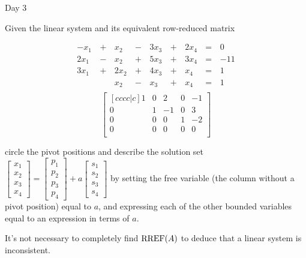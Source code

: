 \begin{applicationActivities}{Day 3}
\begin{activity}{10}
  Given the linear system and its equivalent row-reduced matrix
  \begin{multicols}{2}\noindent
    \begin{alignat*}{5}
      -x_1 &\,+\,&  x_2 &\,-\,&  3x_3 &\,+\,&  2x_4 &\,=\,& 0 \\
      2x_1 &\,-\,&  x_2 &\,+\,&  5x_3 &\,+\,&  3x_4 &\,=\,& -11 \\
      3x_1 &\,+\,& 2x_2 &\,+\,&  4x_3 &\,+\,&   x_4 &\,=\,& 1 \\
           &\, \,&  x_2 &\,-\,&   x_3 &\,+\,&   x_4 &\,=\,& 1 \\
    \end{alignat*}
  \[
    \begin{bmatrix}[cccc|c]
       1 &  0 &  2 &  0 & -1 \\
       0 &  1 & -1 &  0 &  3 \\
       0 &  0 &  0 &  1 & -2 \\
       0 &  0 &  0 &  0 &  0 \\
    \end{bmatrix}
  \]
  \end{multicols}
  circle the pivot positions and describe the solution set
  \(
    \begin{bmatrix}
      x_1 \\
      x_2 \\
      x_3 \\
      x_4
    \end{bmatrix}=
    \begin{bmatrix}
      p_1 \\
      p_2 \\
      p_3 \\
      p_4
    \end{bmatrix}
    +a\begin{bmatrix}
      s_1 \\
      s_2 \\
      s_3 \\
      s_4
    \end{bmatrix}
  \) by setting the free variable (the column without a pivot position)
  equal to \(a\), and expressing each of the other
  bounded variables equal to an expression in terms of \(a\).
\end{activity}

\begin{remark}
  It's not necessary to completely find \(\operatorname{RREF}(A)\) to
  deduce that a linear system is inconsistent.
\end{remark}


\end{applicationActivities}
